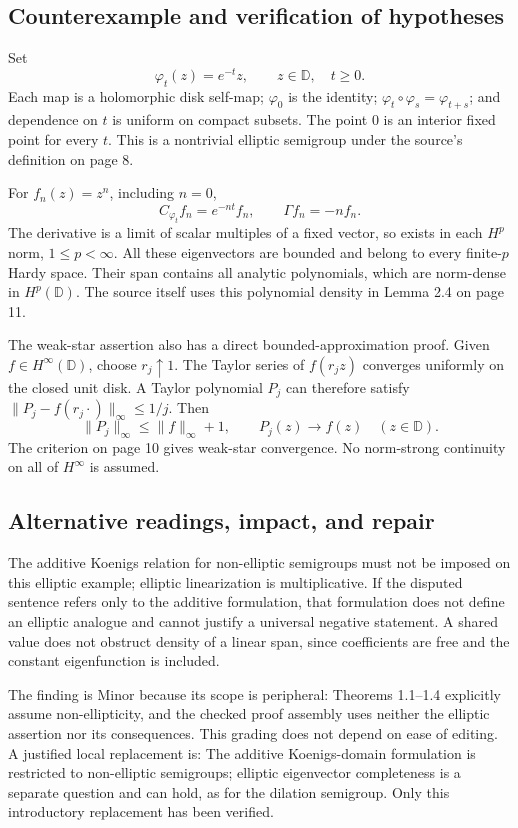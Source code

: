 \documentclass[10pt]{article}
\begin{document}
\subsection*{Counterexample and verification of hypotheses}
Set \[\varphi_t(z)=e^{-t}z,\qquad z\in\mathbb D,\quad t\geq0.\] Each map is a holomorphic disk self-map; \(\varphi_0\) is the identity; \(\varphi_t\circ\varphi_s=\varphi_{t+s}\); and dependence on \(t\) is uniform on compact subsets. The point \(0\) is an interior fixed point for every \(t\). This is a nontrivial elliptic semigroup under the source’s definition on page 8.\par
For \(f_n(z)=z^n\), including \(n=0\), \[C_{\varphi_t}f_n=e^{-nt}f_n,\qquad \Gamma f_n=-n f_n.\] The derivative is a limit of scalar multiples of a fixed vector, so exists in each \(H^p\) norm, \(1\leq p<\infty\). All these eigenvectors are bounded and belong to every finite-\(p\) Hardy space. Their span contains all analytic polynomials, which are norm-dense in \(H^p(\mathbb D)\). The source itself uses this polynomial density in Lemma 2.4 on page 11.\par
The weak-star assertion also has a direct bounded-approximation proof. Given \(f\in H^\infty(\mathbb D)\), choose \(r_j\uparrow1\). The Taylor series of \(f(r_jz)\) converges uniformly on the closed unit disk. A Taylor polynomial \(P_j\) can therefore satisfy \(\|P_j-f(r_j\cdot)\|_\infty\leq1/j\). Then \[\|P_j\|_\infty\leq\|f\|_\infty+1,\qquad P_j(z)\longrightarrow f(z)
 \quad(z\in\mathbb D).\] The criterion on page 10 gives weak-star convergence. No norm-strong continuity on all of \(H^\infty\) is assumed.\par
\subsection*{Alternative readings, impact, and repair}
The additive Koenigs relation for non-elliptic semigroups must not be imposed on this elliptic example; elliptic linearization is multiplicative. If the disputed sentence refers only to the additive formulation, that formulation does not define an elliptic analogue and cannot justify a universal negative statement. A shared value does not obstruct density of a linear span, since coefficients are free and the constant eigenfunction is included.\par
The finding is Minor because its scope is peripheral: Theorems 1.1–1.4 explicitly assume non-ellipticity, and the checked proof assembly uses neither the elliptic assertion nor its consequences. This grading does not depend on ease of editing. A justified local replacement is: The additive Koenigs-domain formulation is restricted to non-elliptic semigroups; elliptic eigenvector completeness is a separate question and can hold, as for the dilation semigroup. Only this introductory replacement has been verified.\par
\end{document}
